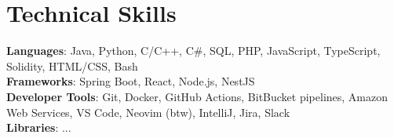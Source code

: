 \documentclass[letterpaper,11pt]{article}
\begin{document}
\section{Technical Skills}
 \begin{itemize}[leftmargin=0.15in, label={}]
    \small{\item{
     \textbf{Languages}{: Java, Python, C/C++, C\#, SQL, PHP, JavaScript, TypeScript, Solidity, HTML/CSS, Bash} \\
     \textbf{Frameworks}{: Spring Boot, React, Node.js, NestJS} \\
     \textbf{Developer Tools}{: Git, Docker, GitHub Actions, BitBucket pipelines, Amazon Web Services, VS Code, Neovim (btw), IntelliJ, Jira, Slack} \\
     \textbf{Libraries}{: ...}
    }}
 \end{itemize}


\end{document}
